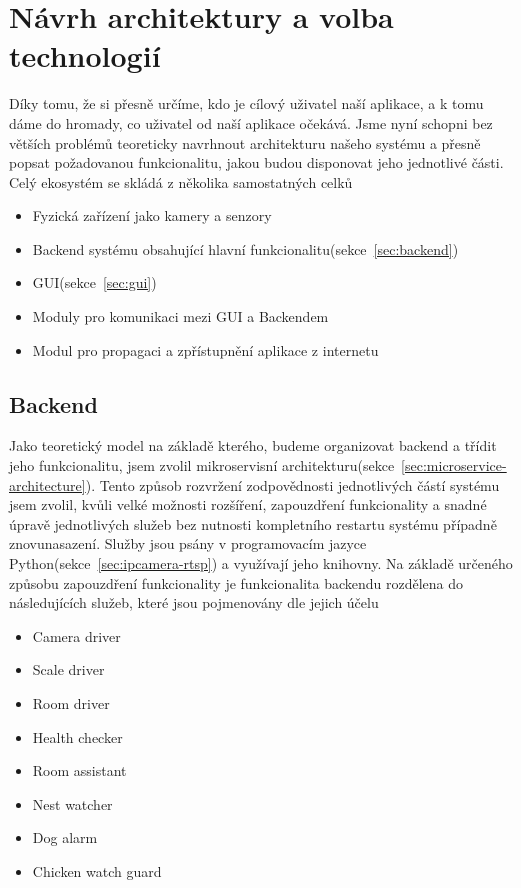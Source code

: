 \section{Návrh architektury a volba technologií}\label{sec:navrh-architektury-a-volba-technologii}
Díky tomu, že si přesně určíme, kdo je cílový uživatel naší aplikace, a k tomu dáme do hromady, co uživatel od naší aplikace očekává.
Jsme nyní schopni bez větších problémů teoreticky navrhnout architekturu našeho systému a přesně popsat požadovanou funkcionalitu, jakou budou disponovat jeho jednotlivé části.
Celý ekosystém se skládá z několika samostatných celků
\begin{itemize}
    \item Fyzická zařízení jako kamery a senzory
    \item Backend systému obsahující hlavní funkcionalitu(sekce~\ref{sec:backend})
    \item GUI(sekce~\ref{sec:gui})
    \item Moduly pro komunikaci mezi GUI a Backendem
    \item Modul pro propagaci a zpřístupnění aplikace z internetu
\end{itemize}

\subsection{Backend}\label{subsec:backend}
Jako teoretický model na základě kterého, budeme organizovat backend a třídit jeho funkcionalitu, jsem zvolil mikroservisní architekturu(sekce~\ref{sec:microservice-architecture}).
Tento způsob rozvržení zodpovědnosti jednotlivých částí systému jsem zvolil, kvůli velké možnosti rozšíření, zapouzdření funkcionality a snadné úpravě jednotlivých služeb bez nutnosti kompletního restartu systému případně znovunasazení.
Služby jsou psány v programovacím jazyce Python(sekce~\ref{sec:ipcamera-rtsp}) a využívají jeho knihovny.
Na základě určeného způsobu zapouzdření funkcionality je funkcionalita backendu rozdělena do následujících služeb, které jsou pojmenovány dle jejich účelu
\begin{itemize}
    \item Camera driver
    \item Scale driver
    \item Room driver
    \item Health checker
    \item Room assistant
    \item Nest watcher
    \item Dog alarm
    \item Chicken watch guard
\end{itemize}

